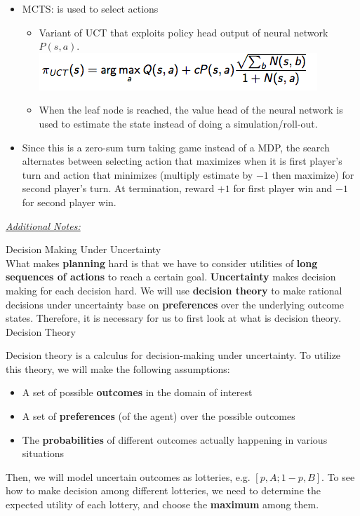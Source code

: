 \documentclass[12pt]{article}
\begin{document}
\begin{tcolorbox}
\begin{itemize}
\item MCTS: is used to select actions
\begin{itemize}
\item Variant of UCT that exploits policy head output of neural network $P(s, a)$.\\
\includegraphics[scale=0.7]{go}
\item When the leaf node is reached, the value head of the neural network is used to estimate the state instead of doing a simulation/roll-out.
\end{itemize}

\item Since this is a zero-sum turn taking game instead of a MDP, the search alternates between selecting action that maximizes when it is first player's turn and action that minimizes (multiply estimate by $-1$ then maximize) for second player's turn. At termination, reward $+1$ for first player win and $-1$ for second player win.
\end{itemize}
\end{tcolorbox}

\underline{\textsl{Additional Notes:}}

\pagebreak 
\noindent
{\large{Decision Making Under Uncertainty}}\\

\noindent
What makes \textbf{planning} hard is that we have to consider utilities of \textbf{long sequences of actions} to reach a certain goal. \textbf{Uncertainty} makes decision making for each decision hard. We will use \textbf{decision theory} to make rational decisions under uncertainty base on \textbf{preferences} over the underlying outcome states. Therefore, it is necessary for us to first look at what is decision theory. \\

\noindent
{\large{Decision Theory}}\\
\begin{tcolorbox}
Decision theory is a calculus for decision-making under uncertainty. To utilize this theory, we will make the following assumptions:\\
\begin{itemize}
\item A set of possible \textbf{outcomes} in the domain of interest
\item  A set of \textbf{preferences} (of the agent) over the possible outcomes
\item The \textbf{probabilities} of different outcomes actually happening in various situations
\end{itemize}
Then, we will model uncertain outcomes as lotteries, e.g. $[p, A; 1-p, B]$. To see how to make decision among different lotteries, we need to determine the expected utility of each lottery, and choose the \textbf{maximum} among them. 
\end{tcolorbox}
\end{document}

